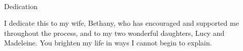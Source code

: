 

\renewcommand{\baselinestretch}{2}
\small\normalsize
\hbox{\ }

\vspace{-.65in}

\begin{center}
\large{Dedication}
\end{center}

\noindent I dedicate this to my wife, Bethany, who has encouraged and supported me throughout the process, and to my two wonderful daughters, Lucy and Madeleine. You brighten my life in ways I cannot begin to explain.
